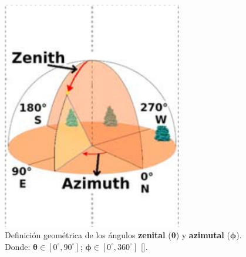 \begin{frame}{}
\begin{columns}
            \begin{column}{0.4\textwidth} %
            \begin{figure}
                    \includegraphics[width=0.7\textwidth]{Figures/angles.png}
                    \caption{\tiny Definición geométrica de los ángulos \textbf{zenital} ($\bm{\theta}$) y \textbf{azimutal} ($\bm{\phi}$). Donde: $\bm{\theta} \in [0^{\circ}, 90^{\circ}]$; $\bm{\phi} \in [0^{\circ}, 360^{\circ}]$ [\cite{asorey2018}].}
            \end{figure}
            \end{column}
        \end{columns}
    \end{frame}

        
